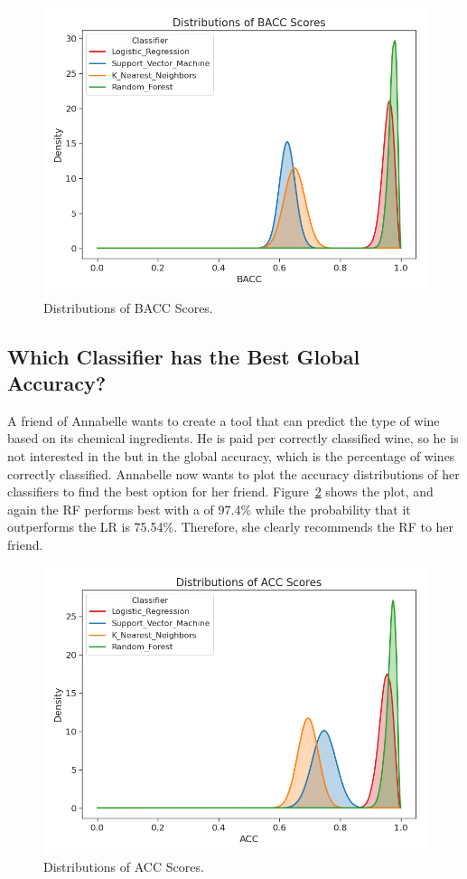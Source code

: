 \documentclass[man]{apa7}
\begin{document}
\begin{figure}[t!]
\centering
\includegraphics{plots/figure2.png}
\caption{Distributions of BACC Scores. \label{fig:comparison}}
\end{figure}

\subsection{Which Classifier has the Best Global Accuracy?} \label{sec:ex_global_acc}

A friend of Annabelle wants to create a tool that can predict the type of wine based on its chemical ingredients.
He is paid per correctly classified wine, so he is not interested in the  but in the global accuracy, which is the percentage of wines correctly classified.
Annabelle now wants to plot the accuracy distributions of her classifiers to find the best option for her friend. Figure~\ref{fig:ACCcomparison} shows the plot, and again the RF performs best with a  of 97.4\% while the probability that it outperforms the LR is 75.54\%.
Therefore, she clearly recommends the RF to her friend.

\begin{figure}[t!]
\centering
\includegraphics{plots/figure3.png}
\caption{Distributions of ACC Scores. \label{fig:ACCcomparison}}
\end{figure}
\end{document}
